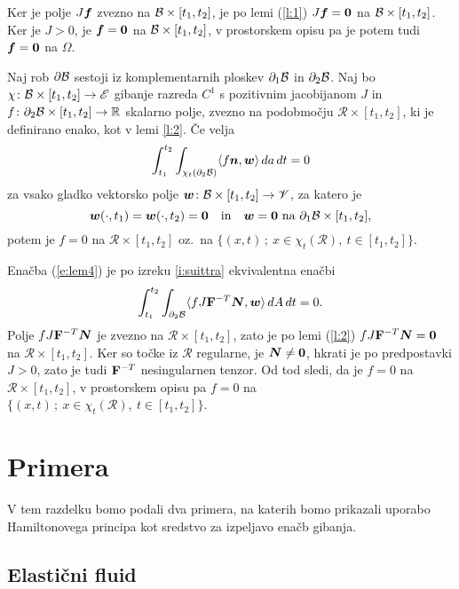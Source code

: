 	Ker je polje $J\boldsymbol f$ zvezno na $\mathcal B\times[t_1,t_2]$, je
	po lemi (\ref{l:1}) $J\boldsymbol f=\boldsymbol 0$
	na $\mathcal B\times[t_1,t_2]$. Ker je $J>0$, je $\boldsymbol f=\boldsymbol 0$ na $\mathcal B\times[t_1,t_2]$,
	v prostorskem opisu pa je potem tudi $\boldsymbol f=\boldsymbol 0$ na $\Omega$.
\endproof

\begin{lema} \label{lema4}
	Naj rob $\partial \mathcal B$ sestoji iz komplementarnih ploskev $\partial_1 \mathcal B$ in $\partial_2 \mathcal B$.
	Naj bo $\chi\colon \mathcal B\times[t_1,t_2]\to\mathscr E$ gibanje razreda $C^1$ s pozitivnim jacobijanom $J$ in
	$f\colon\partial_2 \mathcal B\times[t_1,t_2]\to\mathbb R$ skalarno polje, zvezno na podobmočju $\mathcal{R}\times[t_1,t_2]$,
	ki je definirano enako, kot v lemi \ref{l:2}.
	Če velja
	\begin{equation}\label{e:lem4}
		\int_{t_1}^{t_2}\int_{\chi_t(\partial_2 \mathcal B)}\langle f\boldsymbol n,\boldsymbol w\rangle\,da\,dt=0
	\end{equation}
	za vsako gladko vektorsko polje $\boldsymbol w\colon \mathcal B\times[t_1,t_2]\to\mathscr V$, za katero je
	\[
		\boldsymbol w(\cdot,t_1)=\boldsymbol w(\cdot,t_2)=\boldsymbol 0\quad\textrm{in}
		\quad\boldsymbol w=\boldsymbol 0\ \textrm{na}\ \partial_1 \mathcal B\times[t_1,t_2],
	\]
	potem je $f=0$ na $\mathcal{R}\times[t_1,t_2]$ oz.~na $\{(x,t)\,;\ x\in\chi_t(\mathcal{R}),\ t\in[t_1,t_2] \}$.
\end{lema}

\proof
	Enačba (\ref{e:lem4}) je po izreku \ref{i:suittra} ekvivalentna enačbi
	\[ \int_{t_1}^{t_2}\int_{\partial_2 \mathcal B}\langle fJ\mathbf F^{-T}\boldsymbol N,\boldsymbol w\rangle\,dA\,dt=0. \]
	Polje $fJ\mathbf F^{-T}\boldsymbol N$ je zvezno na $\mathcal{R}\times[t_1,t_2]$,
	zato je po lemi (\ref{l:2}) $fJ\mathbf F^{-T}\boldsymbol N=\boldsymbol 0$ na $\mathcal{R}\times[t_1,t_2]$.
	Ker so točke iz $\mathcal{R}$ regularne, je $\boldsymbol N\neq \boldsymbol 0$, hkrati je po predpostavki $J>0$,
	zato je tudi $\mathbf F^{-T}$ nesingularnen tenzor. Od tod sledi, da je $f=0$ na $\mathcal{R}\times[t_1,t_2]$,
	v prostorskem opisu pa $f=0$ na $\{(x,t)\,;\ x\in\chi_t(\mathcal{R}),\ t\in[t_1,t_2] \}$.
\endproof


\section{Primera} \label{sec:primeri}


V tem razdelku bomo podali dva primera, na katerih bomo prikazali uporabo Hamiltonovega principa
kot sredstvo za izpeljavo enačb gibanja.


\subsection{Elastični fluid}


